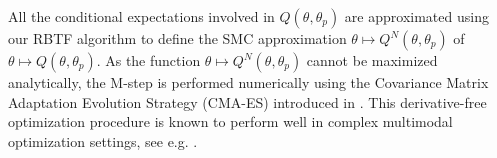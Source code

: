All the conditional expectations involved in $Q(\theta,\theta_p)$ are approximated using our RBTF algorithm to define the SMC approximation  $\theta\mapsto Q^N(\theta,\theta_p)$ of $\theta\mapsto Q(\theta,\theta_p)$.
As the function $\theta\mapsto Q^N(\theta,\theta_p)$ cannot be maximized analytically, the M-step is performed numerically using the Covariance Matrix Adaptation Evolution Strategy (CMA-ES) introduced in \cite{hansen:ostermeier:2001}. This derivative-free optimization procedure is known to perform well in complex multimodal optimization settings, see e.g. \cite{hansen:kern:2004}. 




